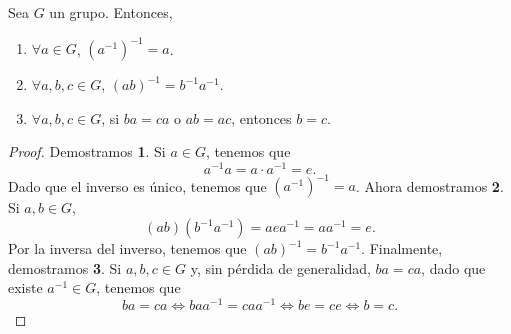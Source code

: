 \begin{prop}
Sea $\displaystyle G $ un grupo. Entonces, 
\begin{enumerate}
\item $\displaystyle \forall a \in G $, $\displaystyle \left(a^{-1}\right)^{-1} = a $.
\item $\displaystyle \forall a,b,c \in G $, $\displaystyle \left(ab\right)^{-1} = b^{-1}a^{-1} $.
\item $\displaystyle \forall a, b, c \in G $, si $\displaystyle ba = ca $ o $\displaystyle ab = ac $, entonces $\displaystyle b = c $.
\end{enumerate}
\end{prop}
\begin{proof}
Demostramos \textbf{1}. Si $\displaystyle a \in G $, tenemos que 
\[a^{-1}a = a \cdot a^{-1} = e .\]
Dado que el inverso es único, tenemos que $\displaystyle \left(a^{-1}\right)^{-1} = a $. Ahora demostramos \textbf{2}. Si $\displaystyle a,b \in G $, 
\[\left(ab\right)\left(b^{-1}a^{-1}\right) = a  e  a^{-1} = a a^{-1} = e .\]
Por la inversa del inverso, tenemos que $\displaystyle \left(ab\right)^{-1} = b^{-1}a^{-1} $. Finalmente, demostramos \textbf{3}. Si $\displaystyle a,b,c \in G $ y, sin pérdida de generalidad, $\displaystyle ba = ca $, dado que existe $\displaystyle a^{-1}\in G $, tenemos que
\[ ba = ca \iff ba a^{-1} = c a a^{-1} \iff b e = ce \iff b = c .\]

\end{proof}
